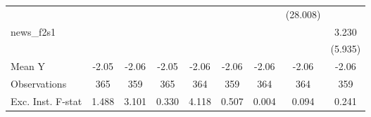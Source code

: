 {\begin{tabular}{l*{8}{c}}
            &                     &                     &                     &                     &                     &                     &    (28.008)         &                     \\
\addlinespace
news\_f2s1   &                     &                     &                     &                     &                     &                     &                     &       3.230         \\
            &                     &                     &                     &                     &                     &                     &                     &     (5.935)         \\
\midrule
Mean Y      &       -2.05         &       -2.06         &       -2.05         &       -2.06         &       -2.06         &       -2.06         &       -2.06         &       -2.06         \\
Observations&         365         &         359         &         365         &         364         &         359         &         364         &         364         &         359         \\
Exc. Inst. F-stat&       1.488         &       3.101         &       0.330         &       4.118         &       0.507         &       0.004         &       0.094         &       0.241         \\
\bottomrule
\end{tabular}
}
